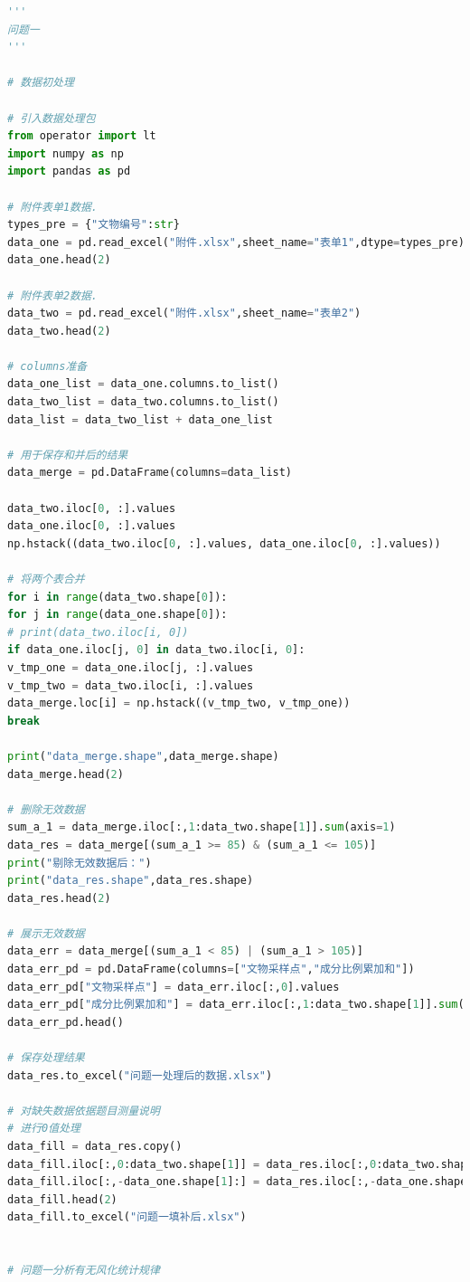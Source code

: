 \documentclass[withoutpreface,bwprint]{cumcmthesis} %
\begin{document}
\begin{appendices}
\begin{lstlisting}[language=python]
'''
问题一
'''

# 数据初处理

# 引入数据处理包
from operator import lt
import numpy as np
import pandas as pd

# 附件表单1数据.
types_pre = {"文物编号":str}
data_one = pd.read_excel("附件.xlsx",sheet_name="表单1",dtype=types_pre)
data_one.head(2)

# 附件表单2数据.
data_two = pd.read_excel("附件.xlsx",sheet_name="表单2")
data_two.head(2)

# columns准备
data_one_list = data_one.columns.to_list()
data_two_list = data_two.columns.to_list()
data_list = data_two_list + data_one_list

# 用于保存和并后的结果
data_merge = pd.DataFrame(columns=data_list)

data_two.iloc[0, :].values
data_one.iloc[0, :].values
np.hstack((data_two.iloc[0, :].values, data_one.iloc[0, :].values))

# 将两个表合并
for i in range(data_two.shape[0]):
for j in range(data_one.shape[0]):
# print(data_two.iloc[i, 0])
if data_one.iloc[j, 0] in data_two.iloc[i, 0]:
v_tmp_one = data_one.iloc[j, :].values
v_tmp_two = data_two.iloc[i, :].values
data_merge.loc[i] = np.hstack((v_tmp_two, v_tmp_one))
break

print("data_merge.shape",data_merge.shape)
data_merge.head(2)

# 删除无效数据
sum_a_1 = data_merge.iloc[:,1:data_two.shape[1]].sum(axis=1)
data_res = data_merge[(sum_a_1 >= 85) & (sum_a_1 <= 105)]
print("剔除无效数据后：")
print("data_res.shape",data_res.shape)
data_res.head(2)

# 展示无效数据
data_err = data_merge[(sum_a_1 < 85) | (sum_a_1 > 105)]
data_err_pd = pd.DataFrame(columns=["文物采样点","成分比例累加和"])
data_err_pd["文物采样点"] = data_err.iloc[:,0].values
data_err_pd["成分比例累加和"] = data_err.iloc[:,1:data_two.shape[1]].sum(axis=1).values
data_err_pd.head()

# 保存处理结果
data_res.to_excel("问题一处理后的数据.xlsx")

# 对缺失数据依据题目测量说明
# 进行0值处理
data_fill = data_res.copy()
data_fill.iloc[:,0:data_two.shape[1]] = data_res.iloc[:,0:data_two.shape[1]].fillna(0)
data_fill.iloc[:,-data_one.shape[1]:] = data_res.iloc[:,-data_one.shape[1]:].fillna("missing")
data_fill.head(2)
data_fill.to_excel("问题一填补后.xlsx")


# 问题一分析有无风化统计规律


\end{lstlisting}
\end{appendices}
\end{document}
